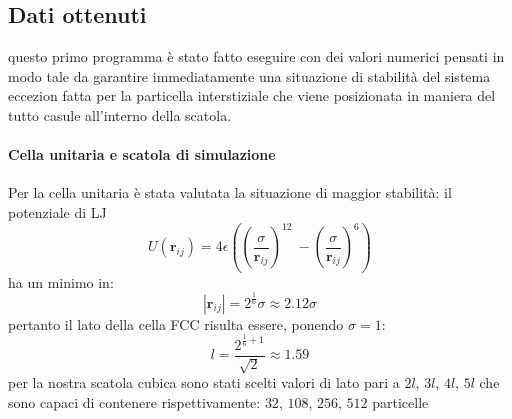 \documentclass[a4paper,11pt]{article}
\begin{document}
	\subsection{Dati ottenuti} %
	\label{sub:dati_ottenuti}
		questo primo programma è stato fatto eseguire con dei valori numerici 
		pensati in modo tale da garantire immediatamente una situazione di stabilità
		del sistema eccezion fatta per la particella interstiziale che viene posizionata in maniera del tutto casule all'interno della scatola.
		\paragraph{Cella unitaria e scatola di simulazione\\} %
		\label{par:cella_unitaria_e_scatola_di_simulazione}
			Per la cella unitaria è stata valutata la situazione di maggior 
			stabilità: il potenziale di LJ
			\begin{equation}
				U(\mathbf{r}_{ij})= 4 \epsilon \left(\left(\frac{\sigma}{\mathbf{r}_{ij}}\right)^{12}\
				-\left(\frac{\sigma}{\mathbf{r}_{ij}}\right)^6\right)
			\end{equation}
			ha un minimo in:
			\begin{equation}
				\left|\mathbf{r}_{ij}\right| = 2^{\frac{1}{6}} \sigma
				\approx 2.12 \sigma
			\end{equation}
			pertanto il lato della cella FCC risulta essere, ponendo $\sigma = 1$:
			\begin{equation}
				l = \frac{2^{\frac{1}{6}+1}}{\sqrt{2}} \approx 1.59
			\end{equation}
			per la nostra scatola cubica sono stati scelti valori di lato pari a 
			$2l$, $3l$, $4l$, $5l$ che sono capaci di contenere rispettivamente: 
			$32$, $108$, $256$, $512$ particelle
\end{document}
